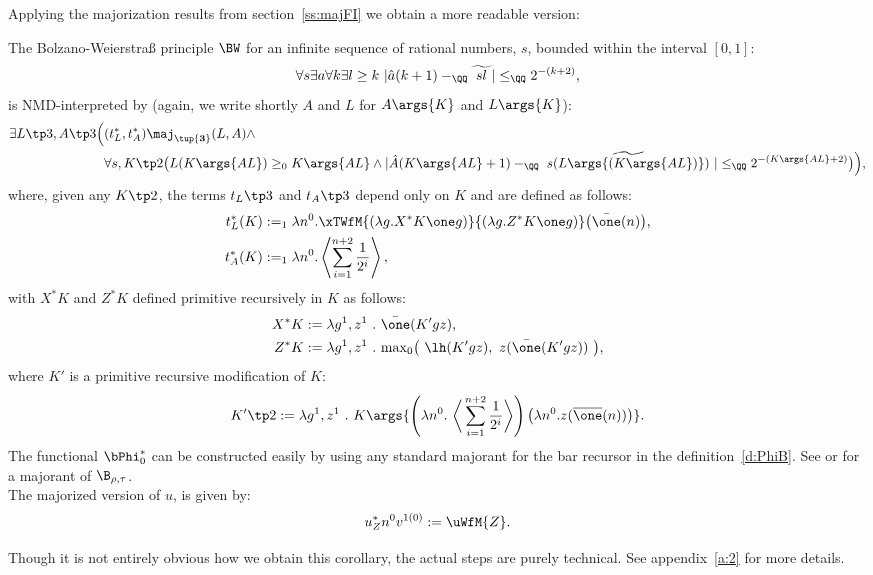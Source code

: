 %
%
%

Applying the majorization results from section~\ref{ss:majFI} we obtain a
more readable version:
%
\begin{cor}\label{c:NMD-bw}
The Bolzano-Weierstra{\ss} principle $\BW$ for an infinite sequence
of rational numbers, $s$, bounded within the interval $[0,1]$:
\[
\forall s
  \exists a\forall k\exists l\geq k\ |\hat a(k+1)-_\QQ \widetilde{\ sl\ }|\leq_\QQ2^{-(k+2)}
\text{,}
\]
is NMD-interpreted by (again, we write shortly $A$ and $L$ for $A\args{K}$ and $L\args{K}$):
\begin{align*}
\exists L\tp3,A\tp3\Big(
 &(t_L^*,t_A^*)\maj_{\tup{\mathbf 3}}(L,A) \wedge \\
 &\forall s, K\tp2
   \big(  L(K\args{AL})\geq_0 K\args{AL} \wedge 
          |\hat A(K\args{AL}+1)-_\QQ \widetilde{\ s(L\args{(K\args{AL})})\ }|\leq_\QQ2^{-({K\args{AL}}+2)}  \big)
\Big)
\text{,}
\end{align*}
where, given any $K\tp2$, the terms $t_L\tp3$ and $t_A\tp3$ depend only
on $K$ and are defined as follows:
\begin{align*}
t_L^*(K)&:=_1
   \lambda n^0.\xTWfM{\left(\lambda g.X^*K\one g\right)}{(\lambda g.Z^*K\one g)}\big(\bar\one(n)\big)\text{,} \\
t_A^*(K)&:=_1\lambda n^0.\left\langle\sum^{n+2}_{i=1}\frac{1}{2^i}\right\rangle 
\text{,}
\end{align*}
with $X^*K$ and $Z^*K$ defined primitive recursively in $K$ as follows:
\begin{align*}
{X^*K}&:=\lambda g^1,z^1\ .\ \bar\one(K'gz)  \text{,} \\
{Z^*K}&:=\lambda g^1,z^1\ .\ {\max}_0\big(\ \lh(K'gz),\ z(\bar\one(K'gz))\ \big)
\text{,}
\end{align*}
where $K'$ is a primitive recursive modification of $K$:
\[
{K'}\tp2:=\lambda g^1,z^1\ .\ K\args{
   \left( \lambda n^0.\ \bigg\langle\sum^{n+2}_{i=1}\frac{1}{2^i}\bigg\rangle \right)
   \left( \lambda n^0.z(\overline{\one}(n)) \right)
}
\text{.}
\]
The functional $\bPhi_0^*$ can be constructed easily by using any standard majorant for
the bar recursor in the definition~\ref{d:PhiB}. See 
\cite{Kohlenbach08} or \cite{Bezem85} for a majorant of $\B_{\rho,\tau}$.\\
The majorized version of $u$, is given by:
\[
u^*_{Z}n^0v^{1(0)}  := \uWfM{Z}
\text{.}
\]
\end{cor}
Though it is not entirely obvious how we obtain this corollary, the
actual steps are purely technical. See appendix~\ref{a:2} for more details.


